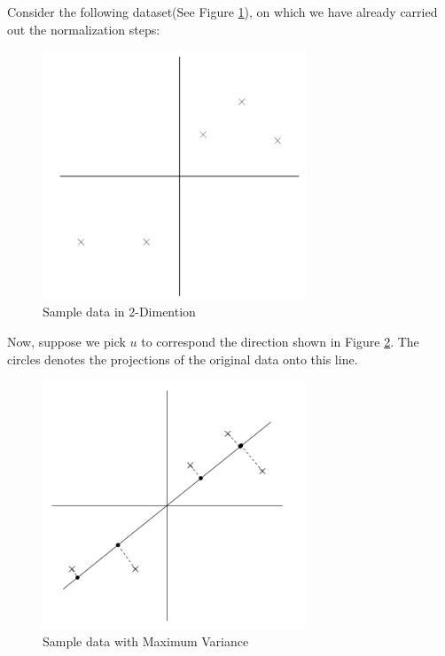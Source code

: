 \documentclass[a4paper]{article}
\begin{document}
Consider the following dataset(See Figure \ref{fig:sample}), on which we have already carried out the normalization steps:
\begin{figure}[h]
\centering
\includegraphics[width=0.7\textwidth]{./images/sample.png}
\caption{\label{fig:sample} Sample data in 2-Dimention}
\end{figure}
Now, suppose we pick $u$ to correspond the direction shown in Figure \ref{fig:samplemax}. The circles denotes the projections of the original data onto this line.
\begin{figure}[h]
\centering
\includegraphics[width=0.7\textwidth]{./images/sample_max.png}
\caption{\label{fig:samplemax} Sample data with Maximum Variance}
\end{figure}
\end{document}
